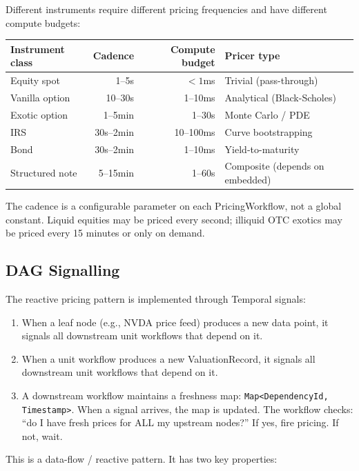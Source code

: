 \documentclass[11pt,a4paper]{article}
\begin{document}
Different instruments require different pricing frequencies and have different compute budgets:

\begin{center}
\small
\begin{tabular}{l r r l}
\toprule
\textbf{Instrument class} & \textbf{Cadence} & \textbf{Compute budget} & \textbf{Pricer type} \\
\midrule
Equity spot & 1--5s & $< 1$ms & Trivial (pass-through) \\
Vanilla option & 10--30s & 1--10ms & Analytical (Black-Scholes) \\
Exotic option & 1--5min & 1--30s & Monte Carlo / PDE \\
IRS & 30s--2min & 10--100ms & Curve bootstrapping \\
Bond & 30s--2min & 1--10ms & Yield-to-maturity \\
Structured note & 5--15min & 1--60s & Composite (depends on embedded) \\
\bottomrule
\end{tabular}
\end{center}

\noindent The cadence is a configurable parameter on each PricingWorkflow, not a global constant.  Liquid equities may be priced every second; illiquid OTC exotics may be priced every 15 minutes or only on demand.

\subsection{DAG Signalling}

The reactive pricing pattern is implemented through Temporal signals:

\begin{enumerate}[nosep]
\item When a leaf node (e.g., NVDA price feed) produces a new data point, it signals all downstream unit workflows that depend on it.
\item When a unit workflow produces a new ValuationRecord, it signals all downstream unit workflows that depend on it.
\item A downstream workflow maintains a freshness map: \texttt{Map<DependencyId, Timestamp>}.  When a signal arrives, the map is updated.  The workflow checks: ``do I have fresh prices for ALL my upstream nodes?''  If yes, fire pricing.  If not, wait.
\end{enumerate}

\noindent This is a data-flow / reactive pattern.  It has two key properties:
\end{document}
